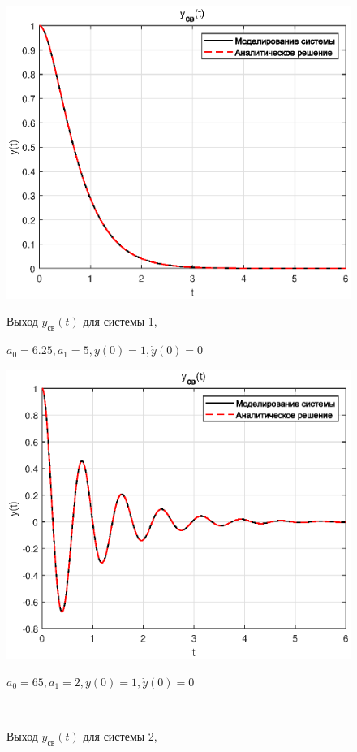 \documentclass[a4paper]{article}
\begin{document}
\begin{figure}[H]
    \begin{minipage}{0.5\textwidth}
        \centering \includegraphics[width=\textwidth]{ex1/1.eps}
        \caption{Выход $y_{\text{св}}(t)$ для системы 1,}
        \centerline{$a_0 = 6.25, a_1 = 5, y(0) = 1, \dot{y}(0) = 0$}
    \end{minipage}\hfill
    \begin{minipage}{0.5\textwidth}
        \centering \includegraphics[width=\textwidth]{ex1/2.eps}
        \caption{Выход $y_{\text{св}}(t)$ для системы 2,}
        \centerline{$a_0 = 65, a_1 = 2, y(0) = 1, \dot{y}(0) = 0$}
    \end{minipage}\\[1em]
\end{figure}\noindent\
\end{document}
